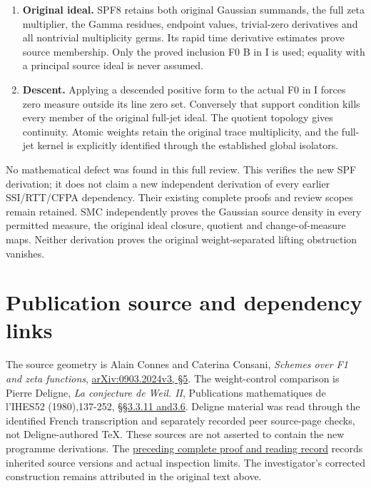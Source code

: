 \begin{enumerate}
  interval proves polynomial interval mass. Conversely that bound makes
  every mixed source integral jointly continuous. The Gaussian-weighted
  Fourier transform determined by the form identifies the measure
  uniquely. The polynomial interval and positive tempered-measure
  conditions are equivalent by the displayed interval estimates.
\item
  \textbf{Original ideal.} SPF8 retains both original Gaussian summands,
  the full zeta multiplier, the Gamma residues, endpoint values,
  trivial-zero derivatives and all nontrivial multiplicity germs. Its
  rapid time derivative estimates prove source membership. Only the
  proved inclusion F0 B in I is used; equality with a principal source
  ideal is never assumed.
\item
  \textbf{Descent.} Applying a descended positive form to the actual F0
  in I forces zero measure outside its line zero set. Conversely that
  support condition kills every member of the original full-jet ideal.
  The quotient topology gives continuity. Atomic weights retain the
  original trace multiplicity, and the full-jet kernel is explicitly
  identified through the established global isolators.
\end{enumerate}

No mathematical defect was found in this full review. This verifies the
new SPF derivation; it does not claim a new independent derivation of
every earlier SSI/RTT/CFPA dependency. Their existing complete proofs
and review scopes remain retained. SMC independently proves the Gaussian
source density in every permitted measure, the original ideal closure,
quotient and change-of-measure maps. Neither derivation proves the
original weight-separated lifting obstruction vanishes.

\section{Publication source and dependency
links}\label{publication-source-and-dependency-links-13}

The source geometry is Alain Connes and Caterina Consani, \emph{Schemes
over F1 and zeta functions},
\href{https://arxiv.org/abs/0903.2024v3}{arXiv:0903.2024v3, §5}. The
weight-control comparison is Pierre Deligne, \emph{La conjecture de
Weil. II}, Publications mathematiques de l'IHES52 (1980),137-252,
\href{https://www.numdam.org/item/PMIHES_1980__52__137_0/}{§§3.3.11
and3.6}. Deligne material was read through the identified French
transcription and separately recorded peer source-page checks, not
Deligne-authored TeX. These sources are not asserted to contain the new
programme derivations. The
\href{https://github.com/KokunoYumeto/zeta-function-research-reader/blob/36a82ecca98addb8a98b48204e349737856c7223/workbenches/splitzero-tandem/continuations/20260924-cohomology-weight-and-character-lifts/BUILD_AND_REVIEW.md}{preceding
complete proof and reading record} records inherited source versions and
actual inspection limits. The investigator's corrected construction
remains attributed in the original text above.
